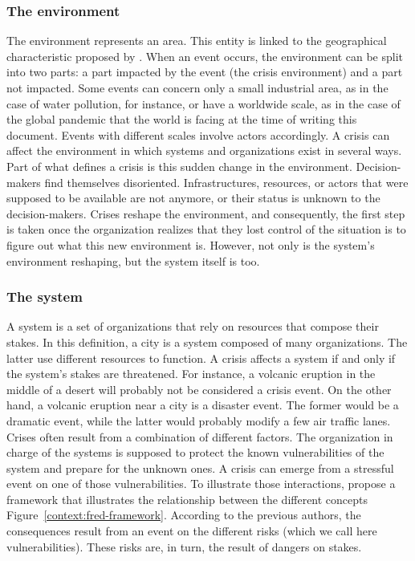 \subsubsection{The environment}
The environment represents an area.
This entity is linked to the geographical characteristic proposed by \textcite{fertierInterpretationAutomatiqueDonnees2018}.
When an event occurs, the environment can be split into two parts: a part impacted by the event (the crisis environment) and a part not impacted.
Some events can concern only a small industrial area, as in the case of water pollution, for instance, or have a worldwide scale, as in the case of the global pandemic that the world is facing at the time of writing this document.
Events with different scales involve actors accordingly.
A crisis can affect the environment in which systems and organizations exist in several ways.
Part of what defines a crisis is this sudden change in the environment.
Decision-makers find themselves disoriented.
Infrastructures, resources, or actors that were supposed to be available are not anymore, or their status is unknown to the decision-makers.
Crises reshape the environment, and consequently, the first step is taken once the organization realizes that they lost control of the situation is to figure out what this new environment is.
However, not only is the system's environment reshaping, but the system itself is too.

\subsubsection{The system}
A system is a set of organizations that rely on resources that compose their stakes.
In this definition, a city is a system composed of many organizations.
The latter use different resources to function.
A crisis affects a system if and only if the system's stakes are threatened.
For instance, a volcanic eruption in the middle of a desert will probably not be considered a crisis event.
On the other hand, a volcanic eruption near a city is a disaster event.
The former would be a dramatic event, while the latter would probably modify a few air traffic lanes.
Crises often result from a combination of different factors.
The organization in charge of the systems is supposed to protect the known vulnerabilities of the system and prepare for the unknown ones.
A crisis can emerge from a stressful event on one of those vulnerabilities.
To illustrate those interactions, \textcite{benabenCollaborativeSystemsCrisis2014} propose a framework that illustrates the relationship between the different concepts Figure~\ref{context:fred-framework}.
According to the previous authors, the consequences result from an event on the different risks (which we call here vulnerabilities).
These risks are, in turn, the result of dangers on stakes.

